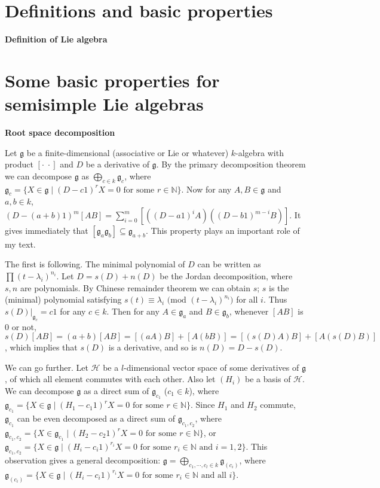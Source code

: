 \documentclass{article}
\newcommand{\NaN}{\mathbb{N}}
\newcommand{\SBar}{\;|\;}
\newcommand{\lie}[1]{\mathfrak{#1}}
\begin{document}
\part{Definitions and basic properties}

\newpage

\textbf{Definition of Lie algebra}

\newpage

\part{Some basic properties for semisimple Lie algebras}

\newpage

\textbf{Root space decomposition}

Let $\lie{g}$ be a finite-dimensional (associative or Lie or whatever) $k$-algebra with product $[\cdot \; \cdot]$ and $D$ be a derivative of $\lie{g}$.
By the primary decomposition theorem we can decompose $\lie{g}$ as $\bigoplus_{c \in k} \lie{g}_c$, where $\lie{g}_c = \{X \in \lie{g} \SBar (D - c1)^r X = 0 \textrm{ for some $r \in \NaN$}\}$.
Now for any $A, B \in \lie{g}$ and $a, b \in k$, $(D - (a + b)1)^m [AB] = \sum_{i = 0}^m [((D - a1)^i A)((D - b1)^{m - i} B)]$.
It gives immediately that $[\lie{g}_a \lie{g}_b] \subseteq \lie{g}_{a + b}$. This property plays an important role of my text.

The first is following. The minimal polynomial of $D$ can be written as $\prod (t - \lambda_i)^{n_i}$.
Let $D = s(D) + n(D)$ be the Jordan decomposition, where $s, n$ are polynomials.
By Chinese remainder theorem we can obtain $s$; $s$ is the (minimal) polynomial satisfying $s(t) \equiv \lambda_i \textrm{ (mod $(t - \lambda_i)^{n_i}$)}$ for all $i$.
Thus $s(D)|_{\lie{g}_c} = c1$ for any $c \in k$.
Then for any $A \in \lie{g}_a$ and $B \in \lie{g}_b$, whenever $[AB]$ is 0 or not, $s(D)[AB] = (a + b)[AB] = [(aA)B] + [A(bB)] = [(s(D)A)B] + [A(s(D)B)]$, which implies that $s(D)$ is a derivative, and so is $n(D) = D - s(D)$.

We can go further.
Let $\mathcal{H}$ be a $l$-dimensional vector space of some derivatives of $\lie{g}$, of which all element commutes with each other.
Also let $(H_i)$ be a basis of $\mathcal{H}$.
We can decompose $\lie{g}$ as a direct sum of $\lie{g}_{c_1}$ ($c_1 \in k$), where $\lie{g}_{c_1} = \{X \in \lie{g} \SBar (H_1 - c_1 1)^r X = 0 \textrm{ for some $r \in \NaN$}\}$.
Since $H_1$ and $H_2$ commute, $\lie{g}_{c_1}$ can be even decomposed as a direct sum of $\lie{g}_{c_1, c_2}$, where $\lie{g}_{c_1, c_2} = \{X \in \lie{g}_{c_1} \SBar (H_2 - c_2 1)^r X = 0 \textrm{ for some $r \in \NaN$}\}$, or $\lie{g}_{c_1, c_2} = \{X \in \lie{g} \SBar (H_i - c_i 1)^{r_i} X = 0 \textrm{ for some $r_i \in \NaN$ and $i = 1, 2$}\}$.
This observation gives a general decomposition: $\lie{g} = \bigoplus_{c_1, \cdots, c_l \in k} \lie{g}_{(c_i)}$, where $\lie{g}_{(c_i)} = \{X \in \lie{g} \SBar (H_i - c_i 1)^{r_i} X = 0 \textrm{ for some $r_i \in \NaN$ and all $i$}\}$.
\end{document}
